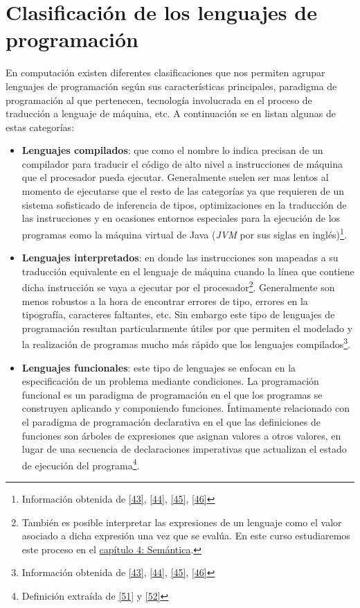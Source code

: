 \section{Clasificación de los lenguajes de programación}

    En computación existen diferentes clasificaciones que nos permiten agrupar lenguajes de programación según sus características principales, paradigma de programación al que pertenecen, tecnología involucrada en el proceso de traducción a lenguaje de máquina, etc. A continuación se en listan algunas de estas categorías: 

    \begin{itemize}
        \item \textbf{Lenguajes compilados}:  que como el nombre lo indica precisan de un compilador para traducir el código de alto nivel a instrucciones de máquina que el procesador pueda ejecutar. Generalmente suelen ser mas lentos al momento de ejecutarse que el resto de las categorías  ya que requieren de un sistema sofisticado de inferencia de tipos, optimizaciones en la traducción de las instrucciones y en ocasiones entornos especiales para la ejecución de los programas como la máquina virtual de Java (\textit{JVM} por sus siglas en inglés)\footnote{Información obtenida de \hyperlink{43}{[43]}, \hyperlink{44}{[44]}, \hyperlink{45}{[45]}, \hyperlink{46}{[46]}}.\\

        \item \textbf{Lenguajes interpretados}: en donde las instrucciones son mapeadas a su traducción equivalente en el lenguaje de máquina cuando la línea que contiene dicha instrucción se vaya a ejecutar por el procesador\footnote{También es posible interpretar las expresiones de un lenguaje como el valor asociado a dicha expresión una vez que se evalúa. En este curso estudiaremos este proceso en el \hyperref[sec:semantics]{capítulo 4: Semántica}.}. Generalmente son menos robustos a la hora de encontrar errores de tipo, errores en la tipografía, caracteres faltantes, etc. Sin embargo este tipo de lenguajes de programación resultan particularmente útiles por que permiten el modelado y la realización de programas mucho más rápido que los lenguajes compilados\footnote{Información obtenida de \hyperlink{43}{[43]}, \hyperlink{44}{[44]}, \hyperlink{45}{[45]}, \hyperlink{46}{[46]}}.\\

        \item \textbf{Lenguajes funcionales}: este tipo de lenguajes se enfocan en la especificación de un problema mediante condiciones. 
         La programación funcional es un paradigma de programación en el que los programas se construyen aplicando y componiendo funciones. Íntimamente relacionado con el paradigma de programación declarativa en el que las definiciones de funciones son árboles de expresiones que asignan valores a otros valores, en lugar de una secuencia de declaraciones imperativas que actualizan el estado de ejecución del programa\footnote{Definición extraída de \hyperlink{51}{[51]} y \hyperlink{52}{[52]}}.\\


\end{itemize}
